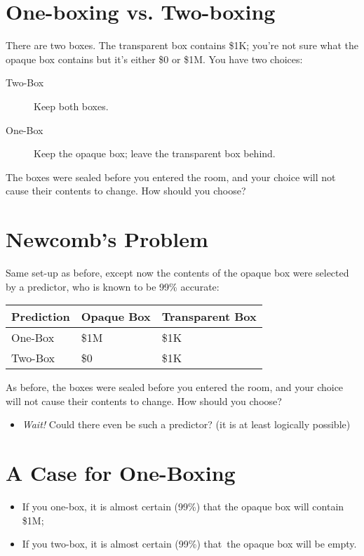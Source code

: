 \documentclass[12pt]{extarticle}
\begin{document}


\section{One-boxing vs. Two-boxing}

There are two boxes. The transparent box contains \$1K; you're not sure what the opaque box contains but it's either \$0 or \$1M. You have two choices: 
\begin{description}
\item[Two-Box]
Keep both boxes.
\item[One-Box]
Keep the opaque box; leave the transparent box behind. 
\end{description}
The boxes were sealed before you entered the room, and your choice will not cause their contents to change. How should you choose?


\section{Newcomb's Problem}

Same set-up as before, except now the contents of the opaque box were selected by a predictor, who is known to be 99\% accurate:

\begin{longtable}[c]{@{}lll@{}}
\hline
\textbf{Prediction} & \textbf{Opaque Box} & \textbf{Transparent Box}
\tabularnewline
\hline
\endhead
One-Box & \$1M & \$1K\tabularnewline
Two-Box & \$0 & \$1K\tabularnewline
\hline
\end{longtable}
\noindent
As before, the boxes were sealed before you entered the room, and your choice will not cause their contents to change. How should you choose?


\begin{itemize}

\item \emph{Wait!} Could there even be such a predictor? (it is at least logically possible)

\end{itemize}

\section{A Case for One-Boxing}


\begin{itemize}

\item
  {If you one-box, it is almost certain
  (99\%) that the opaque box will contain \$1M;}

\item
  {If you two-box, it is almost certain (99\%)
  that~the opaque box will be empty.
  }
\end{itemize}
\end{document}
